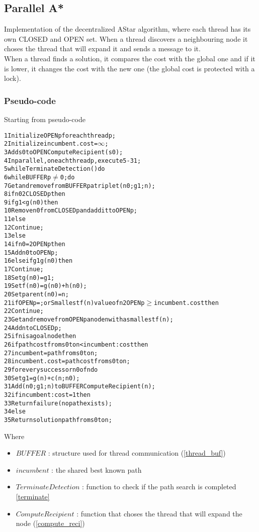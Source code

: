 \subsection{Parallel A*}

Implementation of the decentralized AStar algorithm, where each thread has its own CLOSED and OPEN set.
When a thread discovers a neighbouring node it choses the thread that will expand it and sends a message to it.
\\
When a thread finds a solution, it compares the cost with the global one and if it is lower, it changes the cost with the new one (the global cost is protected with a lock).

\subsubsection{Pseudo-code}

Starting from pseudo-code \cite{bibParAstar}

\begin{alltt}
    1 Initialize OPENp for each thread p;
    2 Initialize incumbent.cost = \(\infty\);
    3 Add s0 to OPENComputeRecipient(s0);
    4 In parallel, on each thread p, execute 5-31;
    5 while TerminateDetection() do
    6   while BUFFERp \(\neq\) 0 ; do
    7       Get and remove from BUFFERp a triplet (n0; g1; n);
    8       if n0 2 CLOSEDp then
    9           if g1 < g(n0) then
    10              Remove n0 from CLOSEDp and add it to OPENp;
    11             else
    12                  Continue;
    13      else
    14          if n0 =2 OPENp then
    15              Add n0 to OPENp;
    16          else if g1  g(n0) then
    17              Continue;
    18      Set g(n0) = g1;
    19      Set f(n0) = g(n0) + h(n0);
    20      Set parent(n0) = n;
    21  if OPENp = ; or Smallest f(n) value of n 2 OPENp \(\geq\) incumbent.cost then
    22      Continue;
    23  Get and remove from OPENp a node n with a smallest f(n);
    24  Add n to CLOSEDp;
    25  if n is a goal node then
    26      if path cost from s0 to n < incumbent:cost then
    27          incumbent = path from s0 to n;
    28          incumbent.cost = path cost from s0 to n;
    29  for every successor n0 of n do
    30      Set g1 = g(n) + c(n; n0);
    31      Add (n0; g1; n) to BUFFER ComputeRecipient(n);
    32 if incumbent:cost = 1 then
    33  Return failure (no path exists);
    34 else
    35  Return solution path from s0 to n;
\end{alltt}

Where
\begin{itemize}
    \item $BUFFER$ : structure used for thread communication (\ref{thread_buf})
    \item $incumbent$ : the shared best known path
    \item $TerminateDetection$ : function to check if the path search is completed \ref{terminate}
    \item $ComputeRecipient$ : function that choses the thread that will expand the node (\ref{compute_reci})
\end{itemize}


